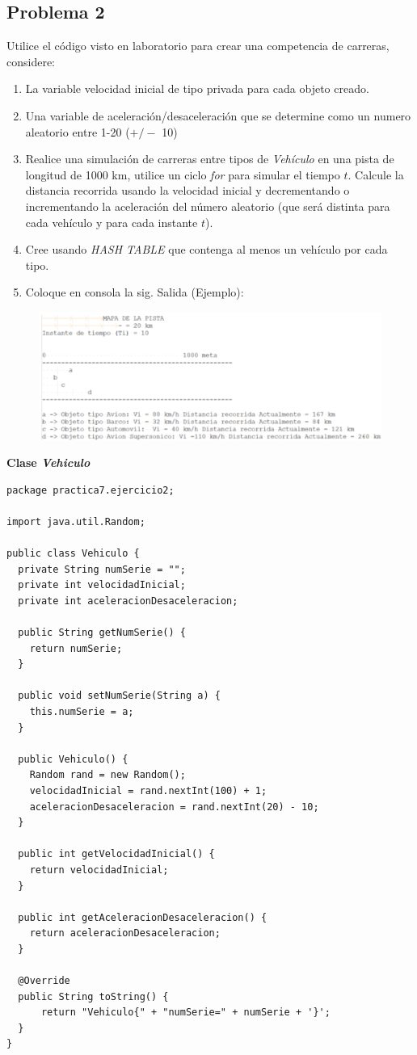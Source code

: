\documentclass[11pt, twocolumn]{article}
\newcommand{\linejump}{\hfill \break}
\begin{document}
  \subsection*{Problema 2}
  Utilice el código visto en laboratorio para crear una competencia de carreras, considere:
  \begin{enumerate}[label=\alph*.]
    \item La variable velocidad inicial de tipo privada para cada objeto creado.
    \item Una variable de aceleración/desaceleración que se determine como un numero
    aleatorio entre 1-20 ($+/-$ 10)
    \item Realice una simulación de carreras entre tipos de \textit{Vehículo} en una pista de
    longitud de 1000 km, utilice un ciclo \textit{for} para simular el tiempo $t$. Calcule la
    distancia recorrida usando la velocidad inicial y decrementando o incrementando
    la aceleración del número aleatorio (que será distinta para cada vehículo y para
    cada instante $t$).
    \item Cree usando \textit{HASH TABLE} que contenga al menos un vehículo por cada tipo.
    \item Coloque en consola la sig. Salida (Ejemplo):
  \end{enumerate}

  \newpage
  \begin{figure}[ht]
    \includegraphics[width=\columnwidth, center]{pista.png}
  \end{figure}

  \linejump
  \textbf{Clase \textit{Vehiculo}}
  \begin{lstlisting}
package practica7.ejercicio2;

import java.util.Random;

public class Vehiculo {
  private String numSerie = "";
  private int velocidadInicial;
  private int aceleracionDesaceleracion;

  public String getNumSerie() {
    return numSerie;
  }

  public void setNumSerie(String a) {
    this.numSerie = a;
  }

  public Vehiculo() {
    Random rand = new Random();
    velocidadInicial = rand.nextInt(100) + 1;
    aceleracionDesaceleracion = rand.nextInt(20) - 10;
  }

  public int getVelocidadInicial() {
    return velocidadInicial;
  }

  public int getAceleracionDesaceleracion() {
    return aceleracionDesaceleracion;
  }

  @Override
  public String toString() {
      return "Vehiculo{" + "numSerie=" + numSerie + '}';
  }
}
  \end{lstlisting}
  
\end{document}
